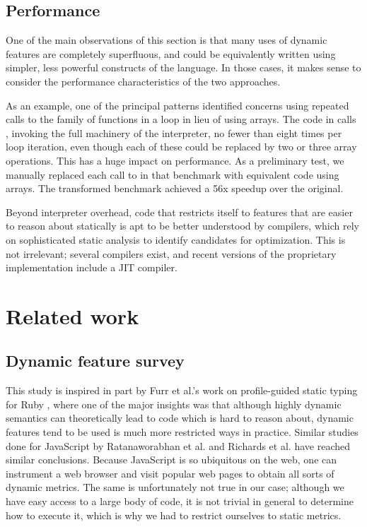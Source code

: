 \subsection{Performance}

One of the main observations of this section is that many uses of dynamic
features are completely superfluous, and could be equivalently written using
simpler, less powerful constructs of the language. In those cases, it makes
sense to consider the performance characteristics of the two approaches.

As an example, one of the principal patterns identified concerns using repeated
calls to the  family of functions in a loop in lieu of using arrays.
The code in  calls , invoking the full
machinery of the interpreter, no fewer than eight times per loop iteration,
even though each of these could be replaced by two or three array operations.
This has a huge impact on performance. As a preliminary test, we manually
replaced each call to  in that benchmark with equivalent code using
arrays. The transformed benchmark achieved a 56x speedup over the original.

Beyond interpreter overhead, code that restricts itself to features that are
easier to reason about statically is apt to be better understood by compilers,
which rely on sophisticated static analysis to identify candidates for
optimization. This is not irrelevant; several \matlab compilers exist, and
recent versions of the proprietary \matlab implementation include a JIT
compiler. %

\section{Related work}

\subsection{Dynamic feature survey}

This study is inspired in part by Furr et al.'s work on profile-guided static
typing for Ruby \cite{ProfileGuidedStaticTyping}, where one of the major
insights was that although highly dynamic semantics can theoretically lead to
code which is hard to reason about, dynamic features tend to be used is much
more restricted ways in practice. Similar studies done for JavaScript by
Ratanaworabhan et al. \cite{JSMeter} and Richards et al.
\cite{TheEvalThatMenDo,DynamicBehaviorJavaScript} have reached similar
conclusions. Because JavaScript is so ubiquitous on the web, one can instrument
a web browser and visit popular web pages to obtain all sorts of dynamic
metrics. The same is unfortunately not true in our case; although we have easy
access to a large body of \matlab code, it is not trivial in general to
determine how to execute it, which is why we had to restrict ourselves to
static metrics.

